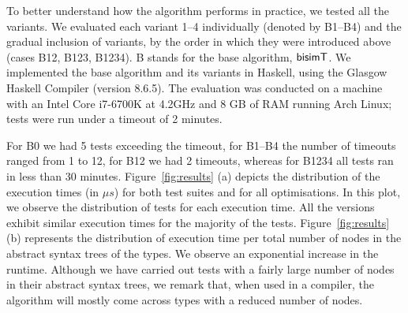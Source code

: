 To better understand how the algorithm performs in practice, we tested
all the variants. We evaluated each variant 1--4 individually (denoted
by B1--B4) and the gradual inclusion of variants, by the
order in which they were introduced above (cases B12, B123, B1234).
B stands for the base algorithm, $\mathsf{bisimT}$.
%
  We implemented the base algorithm and its
  variants %
  in Haskell, using the Glasgow Haskell Compiler (version 8.6.5). %
  The evaluation was conducted on a machine with an Intel Core i7-6700K at
  4.2GHz and 8 GB of RAM running Arch Linux; tests were run under a timeout
  of 2 minutes.

For B0 we had 5 tests exceeding the timeout, for B1--B4 the number of timeouts
ranged from 1 to 12, for B12 we had 2 timeouts, whereas for B1234 all tests
ran in less than 30 minutes. 
%
%
%
Figure~\ref{fig:results} (a) depicts the distribution of the execution
times (in $\mu s$) for both test suites and for all optimisations.  In
this plot, we observe the distribution of tests for each execution
time.  All the versions exhibit similar execution times for the
majority of the tests.   
%
Figure~\ref{fig:results} (b) represents the distribution of execution
time per total number of nodes in the abstract syntax trees of the
types. We observe an exponential increase in the runtime.
%
Although we have carried out tests with a
fairly large number of nodes in their abstract syntax trees, we remark
that, when used in a compiler, the algorithm will mostly come across
types with a reduced number of nodes.


